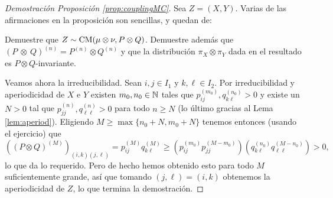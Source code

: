 \begin{proof}[Demostración Proposición \ref{prop:couplingMC}]
Sea $Z=(X,Y)$.
Varias de las afirmaciones en la proposición son sencillas, y quedan de:
\begin{exer}
Demuestre que $Z\sim\text{\upshape{CM}}(\mu\otimes\nu,P\otimes Q)$.
Demuestre además que $(P\!\!\!~\otimes~\!\!\! Q)^{(n)}=P^{(n)}\otimes Q^{(n)}$ y que la distribución $\pi_X\otimes\pi_Y$ dada en el resultado es $P\otimes Q$-invariante.
\end{exer}
\noindent Veamos ahora la irreducibilidad.
Sean $i,j\in I_1$ y $k,\ell\in I_2$.
Por irreducibilidad y aperiodicidad de $X$ e $Y$ existen $m_0,n_0\in\mathbb{N}$ tales que $p^{(m_0)}_{ij},q^{(n_0)}_{k\ell}>0$ y existe un $N>0$ tal que $p^{(n)}_{jj},q^{(n)}_{\ell\ell}>0$ para todo $n\geq N$ (lo último gracias al Lema \ref{lem:aperiod}).
Eligiendo $M\geq\max\{n_0+N,m_0+N\}$ tenemos entonces (usando el ejercicio) que
\[((P\otimes Q)^{(M)})_{(i,k)(j,\ell)}=p^{(M)}_{ij}q^{(M)}_{k\ell}\geq(p^{(m_0)}_{ij}p^{(M-m_0)}_{jj})(q^{(n_0)}_{k\ell}q^{(M-n_0)}_{\ell\ell})>0,\]
lo que da lo requerido.
Pero de hecho hemos obtenido esto para todo $M$ suficientemente grande, así que tomando $(j,\ell)=(i,k)$ obtenemos la aperiodicidad de $Z$, lo que termina la demostración.
\end{proof}

